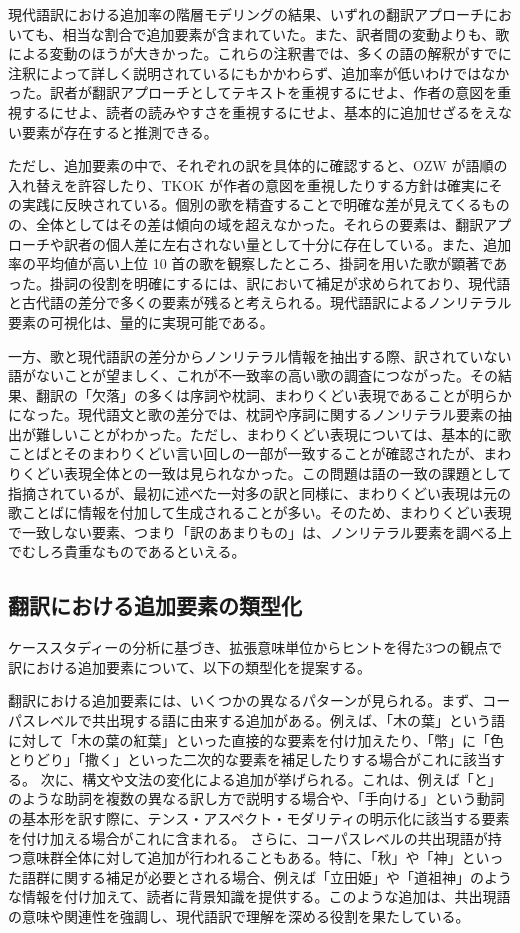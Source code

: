 \documentclass[
  letterpaper,
  DIV=11,
  numbers=noendperiod]{scrartcl}
\begin{document}
現代語訳における追加率の階層モデリングの結果、いずれの翻訳アプローチにおいても、相当な割合で追加要素が含まれていた。また、訳者間の変動よりも、歌による変動のほうが大きかった。これらの注釈書では、多くの語の解釈がすでに注釈によって詳しく説明されているにもかかわらず、追加率が低いわけではなかった。訳者が翻訳アプローチとしてテキストを重視するにせよ、作者の意図を重視するにせよ、読者の読みやすさを重視するにせよ、基本的に追加せざるをえない要素が存在すると推測できる。

ただし、追加要素の中で、それぞれの訳を具体的に確認すると、OZW
が語順の入れ替えを許容したり、TKOK
が作者の意図を重視したりする方針は確実にその実践に反映されている。個別の歌を精査することで明確な差が見えてくるものの、全体としてはその差は傾向の域を超えなかった。それらの要素は、翻訳アプローチや訳者の個人差に左右されない量として十分に存在している。また、追加率の平均値が高い上位
10
首の歌を観察したところ、掛詞を用いた歌が顕著であった。掛詞の役割を明確にするには、訳において補足が求められており、現代語と古代語の差分で多くの要素が残ると考えられる。現代語訳によるノンリテラル要素の可視化は、量的に実現可能である。

一方、歌と現代語訳の差分からノンリテラル情報を抽出する際、訳されていない語がないことが望ましく、これが不一致率の高い歌の調査につながった。その結果、翻訳の「欠落」の多くは序詞や枕詞、まわりくどい表現であることが明らかになった。現代語文と歌の差分では、枕詞や序詞に関するノンリテラル要素の抽出が難しいことがわかった。ただし、まわりくどい表現については、基本的に歌ことばとそのまわりくどい言い回しの一部が一致することが確認されたが、まわりくどい表現全体との一致は見られなかった。この問題は語の一致の課題として指摘されているが、最初に述べた一対多の訳と同様に、まわりくどい表現は元の歌ことばに情報を付加して生成されることが多い。そのため、まわりくどい表現で一致しない要素、つまり「訳のあまりもの」は、ノンリテラル要素を調べる上でむしろ貴重なものであるといえる。

\subsection{翻訳における追加要素の類型化}\label{ux7ffbux8a33ux306bux304aux3051ux308bux8ffdux52a0ux8981ux7d20ux306eux985eux578bux5316}

ケーススタディーの分析に基づき、拡張意味単位からヒントを得た3つの観点で訳における追加要素について、以下の類型化を提案する。

翻訳における追加要素には、いくつかの異なるパターンが見られる。まず、コーパスレベルで共出現する語に由来する追加がある。例えば、「木の葉」という語に対して「木の葉の紅葉」といった直接的な要素を付け加えたり、「幣」に「色とりどり」「撒く」といった二次的な要素を補足したりする場合がこれに該当する。
次に、構文や文法の変化による追加が挙げられる。これは、例えば「と」のような助詞を複数の異なる訳し方で説明する場合や、「手向ける」という動詞の基本形を訳す際に、テンス・アスペクト・モダリティの明示化に該当する要素を付け加える場合がこれに含まれる。
さらに、コーパスレベルの共出現語が持つ意味群全体に対して追加が行われることもある。特に、「秋」や「神」といった語群に関する補足が必要とされる場合、例えば「立田姫」や「道祖神」のような情報を付け加えて、読者に背景知識を提供する。このような追加は、共出現語の意味や関連性を強調し、現代語訳で理解を深める役割を果たしている。
\end{document}
